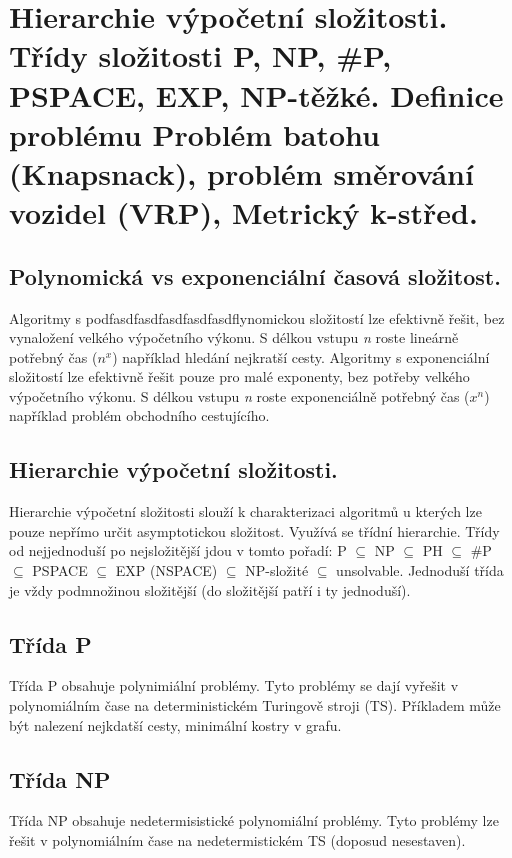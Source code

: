 \section{Hierarchie výpočetní složitosti. Třídy složitosti P, NP, \#P, PSPACE, EXP, NP-těžké. Definice problému Problém batohu (Knapsnack), problém směrování vozidel (VRP), Metrický k-střed.}

\subsection{Polynomická vs exponenciální časová složitost.}

Algoritmy s podfasdfasdfasdfasdfasdflynomickou složitostí lze efektivně řešit, bez vynaložení velkého výpočetního výkonu. 
S délkou vstupu \textit{n} roste lineárně potřebný čas ($n^x$) například hledání nejkratší cesty. 
Algoritmy s exponenciální složitostí lze efektivně řešit pouze pro malé exponenty, bez potřeby velkého výpočetního výkonu. 
S délkou vstupu \textit{n} roste exponenciálně potřebný čas ($x^n$) například problém obchodního cestujícího.

\subsection{Hierarchie výpočetní složitosti.}

Hierarchie výpočetní složitosti slouží k charakterizaci algoritmů u kterých lze pouze nepřímo určit asymptotickou složitost. 
Využívá se třídní hierarchie. 
Třídy od nejjednoduší po nejsložitější jdou v tomto pořadí: P $\subseteq$ NP $\subseteq$ PH $\subseteq$ \#P $\subseteq$ PSPACE $\subseteq$ EXP (NSPACE) $\subseteq$ NP-složité $\subseteq$ unsolvable. 
Jednoduší třída je vždy podmnožinou složitější (do složitější patří i ty jednoduší).

\subsection{Třída P}

Třída P obsahuje polynimiální problémy. 
Tyto problémy se dají vyřešit v polynomiálním čase na deterministickém Turingově stroji (TS). 
Příkladem může být nalezení nejkdatší cesty, minimální kostry v grafu.

\subsection{Třída NP}

Třída NP obsahuje nedetermisistické polynomiální problémy. 
Tyto problémy lze řešit v polynomiálním čase na nedetermistickém TS (doposud nesestaven).

